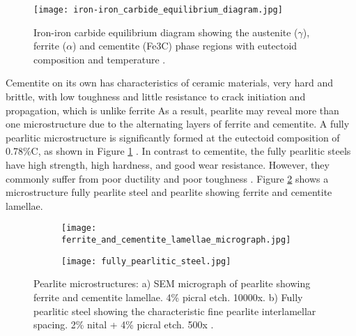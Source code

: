 \begin{figure}[H]
    \centering
    \texttt{[image: iron-iron\_carbide\_equilibrium\_diagram.jpg]}
    \caption{Iron-iron carbide equilibrium diagram showing the austenite ($\gamma$), ferrite ($\alpha$) and cementite (Fe3C) phase regions with eutectoid composition and temperature \cite{cmrp2014maintenance}.}
    \label{ch3:figure:equilibrium}
\end{figure}

Cementite on its own has characteristics of ceramic materials, very hard and brittle, with low toughness and little resistance to crack initiation and propagation, which is unlike ferrite \cite{bajaj2020steels} As a result, pearlite may reveal more than one microstructure due to the alternating layers of ferrite and cementite. A fully pearlitic microstructure is significantly formed at the eutectoid composition of 0.78\%C, as shown in Figure \ref{ch3:figure:equilibrium} \cite{molabe2018determining}. In contrast to cementite, the fully pearlitic steels have high strength, high hardness, and good wear resistance. However, they commonly suffer from poor ductility and poor toughness \cite{molabe2018determining}. Figure \ref{ch3:figure:pearlite:microstructures} shows a microstructure fully pearlite steel and pearlite showing ferrite and cementite lamellae.

\begin{figure}[H]

\centering
\begin{subfigure}{.45\textwidth}
    \centering
    \texttt{[image: ferrite\_and\_cementite\_lamellae\_micrograph.jpg]}
    \caption{}
\end{subfigure}
\begin{subfigure}{.45\textwidth}
    \centering
    \texttt{[image: fully\_pearlitic\_steel.jpg]}
    \caption{}
\end{subfigure}

\caption{Pearlite microstructures:  a) SEM micrograph of pearlite showing ferrite and cementite lamellae. 4\% picral etch. 10000x. b) Fully pearlitic steel showing the characteristic fine pearlite interlamellar spacing. 2\% nital + 4\% picral etch. 500x \cite{molabe2018determining}.}
\label{ch3:figure:pearlite:microstructures}
\end{figure}

